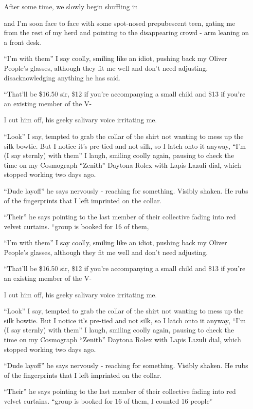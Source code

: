 \documentclass[19pt,openany]{book}
\begin{document}
After some time, we slowly begin
shuffling in

and I'm soon face to face with
some spot-nosed prepubescent teen, gating me from the rest of my herd
and pointing to the disappearing crowd - arm leaning
on a front desk.

``I'm with them'' I say
coolly, smiling like an idiot,
pushing back my Oliver People's glasses, although they
fit me well and don't need adjusting.
disacknowledging anything
he has said.

``That'll be \$16.50 sir, \$12 if you're accompanying a small child
and \$13 if you're an existing member
of the V-

I cut him off, his geeky salivary
voice irritating me.

``Look'' I say, tempted to
grab the collar of the shirt
not wanting to mess up the
silk bowtie. But I notice it's pre-tied
and not silk, so I latch onto it
anyway, ``I'm (I say sternly) with them'' I laugh, smiling coolly again,
pausing to check the time on my
Cosmograph “Zenith” Daytona Rolex with Lapis Lazuli dial, which stopped working two days ago.

``Dude layoff'' he says nervously -
reaching for something.
Visibly shaken. He rubs of the
fingerprints that I left
imprinted on the collar.

``Their''
he says pointing
to the last member
of their collective fading
into red velvet curtains.
``group is booked for 16 of them,

``I'm with them'' I say
coolly, smiling like an idiot,
pushing back my Oliver People's glasses, although they
fit me well and don't need adjusting.

``That'll be \$16.50 sir, \$12 if you're accompanying a small child
and \$13 if you're an existing member
of the V-

I cut him off, his geeky salivary
voice irritating me.

``Look'' I say, tempted to
grab the collar of the shirt
not wanting to mess up the
silk bowtie. But I notice it's pre-tied
and not silk, so I latch onto it
anyway, ``I'm (I say sternly) with them'' I laugh, smiling coolly again,
pausing to check the time on my
Cosmograph “Zenith” Daytona Rolex with Lapis Lazuli dial, which stopped working two days ago.

``Dude layoff'' he says nervously -
reaching for something.
Visibly shaken. He rubs of the
fingerprints that I left
imprinted on the collar.

``Their''
he says pointing
to the last member
of their collective fading
into red velvet curtains.
``group is booked for 16 of them,
I counted 16 people''
\end{document}
